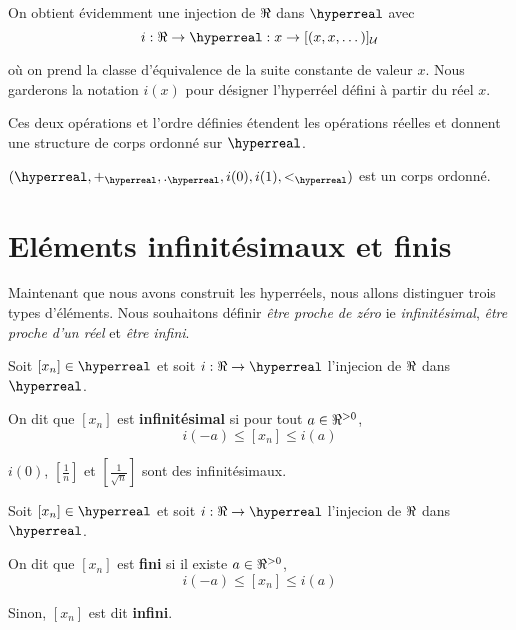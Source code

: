 \documentclass[a4paper, 12pt]{report}
\begin{document}
On obtient évidemment une injection de $\real$ dans $\hyperreal$ avec
\begin{equation}
	i : \real \rightarrow \hyperreal : x \rightarrow [(x, x, \dots)]_{\mathcal{U}}
\end{equation}

où on prend la classe d'équivalence de la suite constante de valeur $x$. Nous
garderons la notation $i(x)$ pour désigner l'hyperréel défini à partir du réel
$x$.

Ces deux opérations et l'ordre définies étendent les opérations réelles et
donnent une structure de corps ordonné sur $\hyperreal$.

\begin{proposition}
	$(\hyperreal, +_{\hyperreal}, ._{\hyperreal}, i(0), i(1),
<_{\hyperreal})$ est un corps ordonné.
\end{proposition}

\section{Eléments infinitésimaux et finis}

Maintenant que nous avons construit les hyperréels, nous allons distinguer trois
types d'éléments. Nous souhaitons définir \textit{être proche de zéro} ie
\textit{infinitésimal}, \textit{être proche d'un réel} et \textit{être infini}.

\begin{definition} [Infinitésimal]
	Soit $[x_{n}] \in \hyperreal$ et soit $i : \real \rightarrow \hyperreal$
	l'injecion de $\real$ dans $\hyperreal$.

	On dit que $[x_{n}]$ est \textbf{infinitésimal} si pour tout $a \in \real^{>
	0}$,
	\begin{equation}
		i(-a) \leq [x_{n}] \leq i(a)
	\end{equation}
\end{definition}

\begin{exemple}
	$i(0)$, $[\frac{1}{n}]$ et $[\frac{1}{\sqrt{n}}]$ sont des infinitésimaux.
\end{exemple}

\begin{definition} 
	Soit $[x_{n}] \in \hyperreal$ et soit $i : \real \rightarrow \hyperreal$
	l'injecion de $\real$ dans $\hyperreal$.

	On dit que $[x_{n}]$ est \textbf{fini} si il existe $a \in \real^{> 0}$,
	\begin{equation}
		i(-a) \leq [x_{n}] \leq i(a)
	\end{equation}

	Sinon, $[x_{n}]$ est dit \textbf{infini}.
\end{definition}
\end{document}
